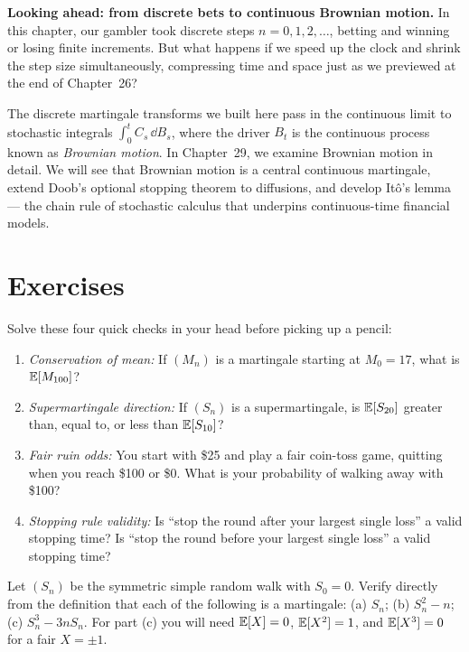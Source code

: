 \chapterline

\textbf{Looking ahead: from discrete bets to continuous Brownian motion.}
In this chapter, our gambler took discrete steps $n = 0, 1, 2, \dots$, betting and winning or losing
finite increments. But what happens if we speed up the clock and shrink the step size simultaneously,
compressing time and space just as we previewed at the end of Chapter~26?

The discrete martingale transforms we built here pass in the continuous limit to stochastic integrals
$\int_0^t C_s\,\dd B_s$, where the driver $B_t$ is the continuous process known as
\emph{Brownian motion}. In Chapter~29, we examine Brownian motion in detail. We will see that Brownian
motion is a central continuous martingale, extend Doob's optional stopping theorem
to diffusions, and develop It\^o's lemma --- the chain rule of
stochastic calculus that underpins continuous-time financial models.

\section{Exercises}
\label{ch28:exercises}

\begin{exercise}
\label{ch28:exer-mental}
Solve these four quick checks in your head before picking up a pencil:
\begin{enumerate}
\item \emph{Conservation of mean:} If $(M_n)$ is a martingale starting at $M_0 = 17$, what is
$\operatorname{\mathbb{E}}[M_{100}]$?
\item \emph{Supermartingale direction:} If $(S_n)$ is a supermartingale, is $\operatorname{\mathbb{E}}[S_{20}]$ greater than,
equal to, or less than $\operatorname{\mathbb{E}}[S_{10}]$?
\item \emph{Fair ruin odds:} You start with \$25 and play a fair coin-toss game, quitting when you reach
\$100 or \$0. What is your probability of walking away with \$100?
\item \emph{Stopping rule validity:} Is ``stop the round after your largest single loss'' a valid stopping
time? Is ``stop the round before your largest single loss'' a valid stopping time?
\end{enumerate}
\end{exercise}

\begin{exercise}
\label{ch28:exer-warmup}
Let $(S_n)$ be the symmetric simple random walk with $S_0 = 0$. Verify directly from the definition
that each of the following is a martingale: (a) $S_n$; (b) $S_n^2 - n$; (c) $S_n^3 - 3n S_n$. For part
(c) you will need $\operatorname{\mathbb{E}}[X] = 0$, $\operatorname{\mathbb{E}}[X^2] = 1$, and $\operatorname{\mathbb{E}}[X^3] = 0$ for a fair $X = \pm 1$.
\end{exercise}

